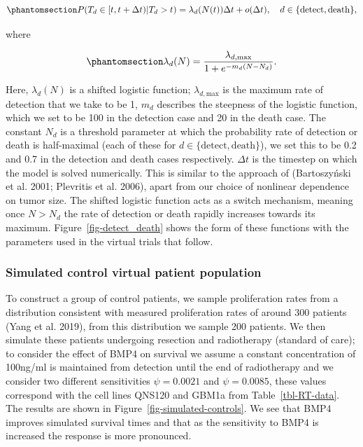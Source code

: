 \documentclass[
  default,
]{sn-jnl}
\begin{document}
\begin{equation}\phantomsection\label{eq-detect_death_hazard}{
  P(T_d \in [t,t+\Delta t) | T_d>t) = \lambda_d (N(t)) \Delta t + o(\Delta t), \quad d \in \{\text{detect},\text{death}\},
}\end{equation}

where

\begin{equation}\phantomsection\label{eq-lambda_N}{
  \lambda_d (N) = \frac{\lambda_{d,\text{max}}}{1 + e^{-m_d(N - N_d)}}.
}\end{equation}

Here, \(\lambda_d(N)\) is a shifted logistic function;
\(\lambda_{d,\text{max}}\) is the maximum rate of detection that we take
to be 1, \(m_d\) describes the steepness of the logistic function, which
we set to be 100 in the detection case and 20 in the death case. The
constant \(N_d\) is a threshold parameter at which the probability rate
of detection or death is half-maximal (each of these for
\(d\in\{\text{detect},\text{death}\}\)), we set this to be 0.2 and 0.7
in the detection and death cases respectively. \(\Delta t\) is the
timestep on which the model is solved numerically. This is similar to
the approach of (Bartoszyński et al. 2001; Plevritis et al. 2006), apart
from our choice of nonlinear dependence on tumor size. The shifted
logistic function acts as a switch mechanism, meaning once \(N > N_d\)
the rate of detection or death rapidly increases towards its maximum.
Figure~\ref{fig-detect_death} shows the form of these functions with the
parameters used in the virtual trials that follow.

\subsubsection{Simulated control virtual patient
population}\label{sec-simulation-controls}

To construct a group of control patients, we sample proliferation rates
from a distribution consistent with measured proliferation rates of
around 300 patients (Yang et al. 2019), from this distribution we sample
200 patients. We then simulate these patients undergoing resection and
radiotherapy (standard of care); to consider the effect of BMP4 on
survival we assume a constant concentration of 100ng/ml is maintained
from detection until the end of radiotherapy and we consider two
different sensitivities \(\psi = 0.0021\) and \(\psi = 0.0085\), these
values correspond with the cell lines QNS120 and GBM1a from
Table~\ref{tbl-RT-data}. The results are shown in
Figure~\ref{fig-simulated-controls}. We see that BMP4 improves simulated
survival times and that as the sensitivity to BMP4 is increased the
response is more pronounced.
\end{document}
